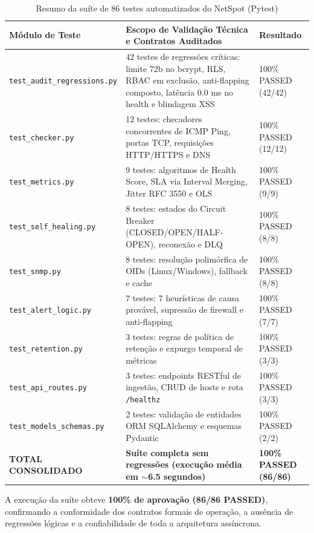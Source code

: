 \documentclass[12pt,a4paper]{article}
\newcommand{\fonte}[1]{\par\vspace{-0.5em}{\small Fonte: #1}\par}
\begin{document}
\begin{table}[H]
\centering
\caption{Resumo da suíte de 86 testes automatizados do NetSpot (Pytest)}
\label{tab:resumo_testes}
\small
\begin{tabular}{@{}p{5.0cm}p{7.8cm}p{2.2cm}@{}}
\toprule
\textbf{Módulo de Teste} & \textbf{Escopo de Validação Técnica e Contratos Auditados} & \textbf{Resultado} \\
\midrule
\texttt{test\_audit\_regressions.py} & 42 testes de regressões críticas: limite 72b no bcrypt, RLS, RBAC em exclusão, anti-flapping composto, latência 0.0 ms no health e blindagem XSS & 100\% PASSED (42/42) \\
\texttt{test\_checker.py} & 12 testes: checadores concorrentes de ICMP Ping, portas TCP, requisições HTTP/HTTPS e DNS & 100\% PASSED (12/12) \\
\texttt{test\_metrics.py} & 9 testes: algoritmos de Health Score, SLA via Interval Merging, Jitter RFC 3550 e OLS & 100\% PASSED (9/9) \\
\texttt{test\_self\_healing.py} & 8 testes: estados do Circuit Breaker (CLOSED/OPEN/HALF-OPEN), reconexão e DLQ & 100\% PASSED (8/8) \\
\texttt{test\_snmp.py} & 8 testes: resolução polimórfica de OIDs (Linux/Windows), fallback e cache & 100\% PASSED (8/8) \\
\texttt{test\_alert\_logic.py} & 7 testes: 7 heurísticas de causa provável, supressão de firewall e anti-flapping & 100\% PASSED (7/7) \\
\texttt{test\_retention.py} & 3 testes: regras de política de retenção e expurgo temporal de métricas & 100\% PASSED (3/3) \\
\texttt{test\_api\_routes.py} & 3 testes: endpoints RESTful de ingestão, CRUD de hosts e rota \texttt{/healthz} & 100\% PASSED (3/3) \\
\texttt{test\_models\_schemas.py} & 2 testes: validação de entidades ORM SQLAlchemy e esquemas Pydantic & 100\% PASSED (2/2) \\
\midrule
\textbf{TOTAL CONSOLIDADO} & \textbf{Suíte completa sem regressões (execução média em $\sim$6.5 segundos)} & \textbf{100\% PASSED (86/86)} \\
\bottomrule
\end{tabular}
\fonte{Autoria própria (2026).}
\end{table}

A execução da suíte obteve \textbf{100\% de aprovação (86/86 PASSED)}, confirmando a conformidade dos contratos formais de operação, a ausência de regressões lógicas e a confiabilidade de toda a arquitetura assíncrona.
\end{document}
